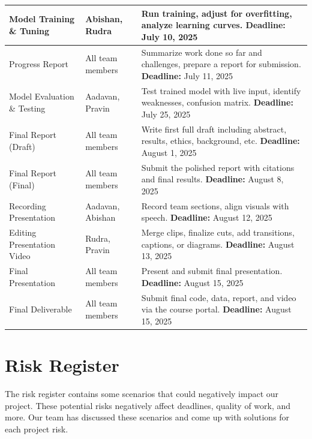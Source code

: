\documentclass{article} %
\begin{document}
\begin{table}[H]
\begin{tabular}{|p{4.5cm}|p{3.5cm}|p{6cm}|}
Model Training \& Tuning & Abishan, Rudra & Run training, adjust for overfitting, analyze learning curves. \newline \textbf{Deadline:} July 10, 2025 \\ \hline
Progress Report & All team members & Summarize work done so far and challenges, prepare a report for submission. \newline \textbf{Deadline:} July 11, 2025 \\ \hline
Model Evaluation \& Testing & Aadavan, Pravin & Test trained model with live input, identify weaknesses, confusion matrix. \newline \textbf{Deadline:} July 25, 2025 \\ \hline
Final Report (Draft) & All team members & Write first full draft including abstract, results, ethics, background, etc. \newline \textbf{Deadline:} August 1, 2025 \\ \hline
Final Report (Final) & All team members & Submit the polished report with citations and final results. \newline \textbf{Deadline:} August 8, 2025 \\ \hline
Recording Presentation & Aadavan, Abishan & Record team sections, align visuals with speech. \newline \textbf{Deadline:} August 12, 2025 \\ \hline
Editing Presentation Video & Rudra, Pravin & Merge clips, finalize cuts, add transitions, captions, or diagrams. \newline \textbf{Deadline:} August 13, 2025 \\ \hline
Final Presentation & All team members & Present and submit final presentation. \newline \textbf{Deadline:} August 15, 2025 \\ \hline
Final Deliverable & All team members & Submit final code, data, report, and video via the course portal. \newline \textbf{Deadline:} August 15, 2025 \\ \hline
\end{tabular}
\end{table}



\section{Risk Register}
The risk register contains some scenarios that could negatively impact our project. 
These potential risks negatively affect deadlines, quality of work, and more. Our team has 
discussed these scenarios and come up with solutions for each project risk. 
\end{document}
